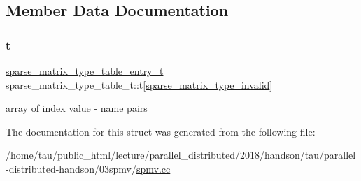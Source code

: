 \subsection{Member Data Documentation}
\mbox{\label{structsparse__matrix__type__table__t_a190c83be8b6111d25205a05ed0b23050}} 
\subsubsection{\texorpdfstring{t}{t}}
{\footnotesize\ttfamily \hyperlink{structsparse__matrix__type__table__entry__t}{sparse\+\_\+matrix\+\_\+type\+\_\+table\+\_\+entry\+\_\+t} sparse\+\_\+matrix\+\_\+type\+\_\+table\+\_\+t\+::t\mbox{[}\hyperlink{spmv_8cc_a43a568fb26bc32aeaad07769cc524c45adbd59ebb0cfb220b9035a64fc2ed28dc}{sparse\+\_\+matrix\+\_\+type\+\_\+invalid}\mbox{]}}

array of index value -\/ name pairs 

The documentation for this struct was generated from the following file\+:\begin{DoxyCompactItemize}
\item 
/home/tau/public\+\_\+html/lecture/parallel\+\_\+distributed/2018/handson/tau/parallel-\/distributed-\/handson/03spmv/\hyperlink{spmv_8cc}{spmv.\+cc}\end{DoxyCompactItemize}
